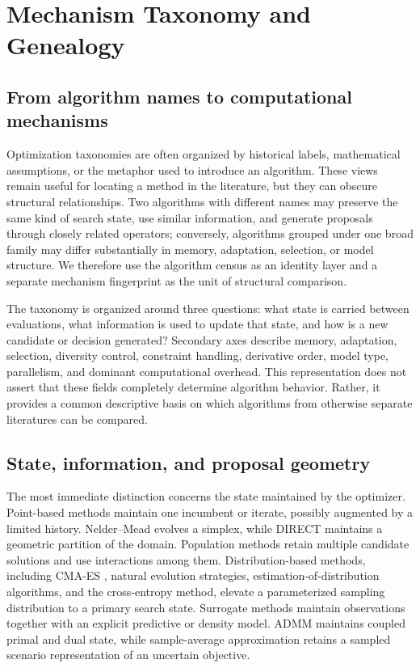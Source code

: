 \section{Mechanism Taxonomy and Genealogy}
\label{sec:taxonomy}

\subsection{From algorithm names to computational mechanisms}

Optimization taxonomies are often organized by historical labels, mathematical assumptions, or the metaphor used to introduce an algorithm. These views remain useful for locating a method in the literature, but they can obscure structural relationships. Two algorithms with different names may preserve the same kind of search state, use similar information, and generate proposals through closely related operators; conversely, algorithms grouped under one broad family may differ substantially in memory, adaptation, selection, or model structure. We therefore use the algorithm census as an identity layer and a separate mechanism fingerprint as the unit of structural comparison.

The taxonomy is organized around three questions: what state is carried between evaluations, what information is used to update that state, and how is a new candidate or decision generated? Secondary axes describe memory, adaptation, selection, diversity control, constraint handling, derivative order, model type, parallelism, and dominant computational overhead. This representation does not assert that these fields completely determine algorithm behavior. Rather, it provides a common descriptive basis on which algorithms from otherwise separate literatures can be compared.

\subsection{State, information, and proposal geometry}

The most immediate distinction concerns the state maintained by the optimizer. Point-based methods maintain one incumbent or iterate, possibly augmented by a limited history. Nelder--Mead \cite{nelder1965simplex} evolves a simplex, while DIRECT maintains a geometric partition of the domain. Population methods retain multiple candidate solutions and use interactions among them. Distribution-based methods, including CMA-ES \cite{hansen2001cma}, natural evolution strategies, estimation-of-distribution algorithms, and the cross-entropy method, elevate a parameterized sampling distribution to a primary search state. Surrogate methods maintain observations together with an explicit predictive or density model. ADMM maintains coupled primal and dual state, while sample-average approximation retains a sampled scenario representation of an uncertain objective.

